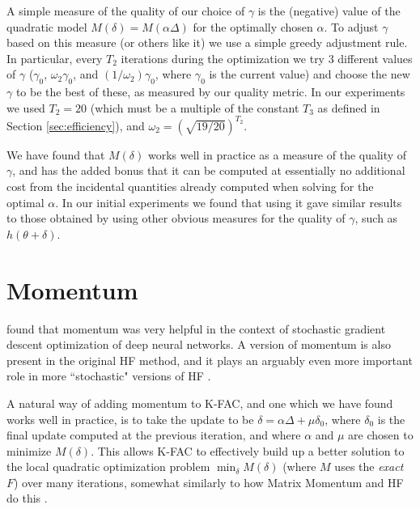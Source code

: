 \documentclass[12pt]{article}
\newcommand{\acronym}{K-FAC}
\begin{document}
A simple measure of the quality of our choice of $\gamma$ is the (negative) value of the quadratic model $M(\delta) = M(\alpha \Delta)$ for the optimally chosen $\alpha$.  To adjust $\gamma$ based on this measure (or others like it) we use a simple greedy adjustment rule.  In particular, every $T_2$ iterations during the optimization we try 3 different values of $\gamma$ ($\gamma_0$, $\omega_2 \gamma_0$, and $(1/\omega_2) \gamma_0$, where $\gamma_0$ is the current value) and choose the new $\gamma$ to be the best of these, as measured by our quality metric.  In our experiments we used $T_2 = 20$ (which must be a multiple of the constant $T_3$ as defined in Section \ref{sec:efficiency}), and $\omega_2 = (\sqrt{19/20})^{T_2}$.

We have found that $M(\delta)$ works well in practice as a measure of the quality of $\gamma$, and has the added bonus that it can be computed at essentially no additional cost from the incidental quantities already computed when solving for the optimal $\alpha$.  In our initial experiments we found that using it gave similar results to those obtained by using other obvious measures for the quality of $\gamma$, such as $h(\theta + \delta)$.




\section{Momentum}
\label{sec:momentum}

\citet{momentum_ilya} found that momentum \citep{momentum_orig, early_nnet_momentum} was very helpful in the context of stochastic gradient descent optimization of deep neural networks.  A version of momentum is also present in the original HF method, and it plays an arguably even more important role in more ``stochastic" versions of HF \citep{HF_chapter,ryan_hf}. 

A natural way of adding momentum to \acronym{}, and one which we have found works well in practice, is to take the update to be $\delta = \alpha \Delta + \mu \delta_0$, where $\delta_0$ is the final update computed at the previous iteration, and where $\alpha$ and $\mu$ are chosen to minimize $M(\delta)$.  This allows \acronym{} to effectively build up a better solution to the local quadratic optimization problem $\min_\delta M(\delta)$ (where $M$ uses the \emph{exact} $F$) over many iterations, somewhat similarly to how Matrix Momentum \citep{MM_natural} and HF do this \citep[see][]{momentum_ilya}.  %
\end{document}
